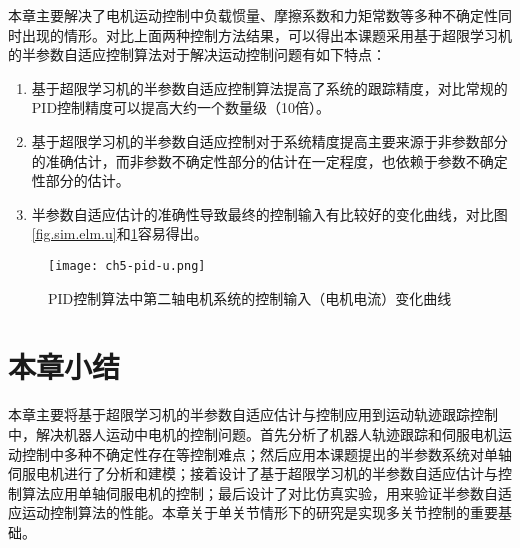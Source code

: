 本章主要解决了电机运动控制中负载惯量、摩擦系数和力矩常数等多种不确定性同时出现的情形。对比上面两种控制方法结果，可以得出本课题采用基于超限学习机的半参数自适应控制算法对于解决运动控制问题有如下特点：
\begin{enumerate}
\item 基于超限学习机的半参数自适应控制算法提高了系统的跟踪精度，对比常规的PID控制精度可以提高大约一个数量级（10倍）。
\item 基于超限学习机的半参数自适应控制对于系统精度提高主要来源于非参数部分的准确估计，而非参数不确定性部分的估计在一定程度，也依赖于参数不确定性部分的估计。
\item 半参数自适应估计的准确性导致最终的控制输入有比较好的变化曲线，对比图\ref{fig.sim.elm.u}和\ref{fig.sim.pid.u}容易得出。
\end{enumerate}

\begin{figure}[!htb]
	\centering
	\texttt{[image: ch5-pid-u.png]}\\	 %
	\caption{PID控制算法中第二轴电机系统的控制输入（电机电流）变化曲线}
	\label{fig.sim.pid.u}
\end{figure}

\section{本章小结}
本章主要将基于超限学习机的半参数自适应估计与控制应用到运动轨迹跟踪控制中，解决机器人运动中电机的控制问题。首先分析了机器人轨迹跟踪和伺服电机运动控制中多种不确定性存在等控制难点；然后应用本课题提出的半参数系统对单轴伺服电机进行了分析和建模；接着设计了基于超限学习机的半参数自适应估计与控制算法应用单轴伺服电机的控制；最后设计了对比仿真实验，用来验证半参数自适应运动控制算法的性能。本章关于单关节情形下的研究是实现多关节控制的重要基础。